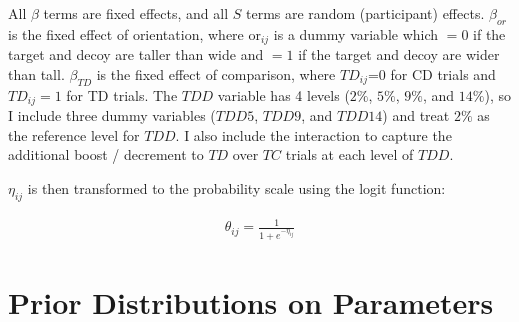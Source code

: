 All $\beta$ terms are fixed effects, and all $S$ terms are random (participant) effects. $\beta_{or}$ is the fixed effect of orientation, where $\text{or}_{ij}$ is a dummy variable which $=0$ if the target and decoy are taller than wide and $=1$ if the target and decoy are wider than tall. $\beta_{TD}$ is the fixed effect of comparison, where $TD_{ij}$=0 for CD trials and $TD_{ij}=1$ for TD trials.  The $TDD$ variable has 4 levels ($2\%$, $5\%$, $9\%$, and $14\%$), so I include three dummy variables ($TDD5$, $TDD9$, and $TDD14$) and treat $2\%$ as the reference level for $TDD$. I also include the interaction to capture the additional boost / decrement to $TD$ over $TC$ trials at each level of $TDD$. 

$\eta_{ij}$ is then transformed to the probability scale using the logit function:

\begin{align}
    \theta_{ij}=\frac{1}{1+e^{-\eta_{ij}}}
\end{align}

\section{Prior Distributions on Parameters}

